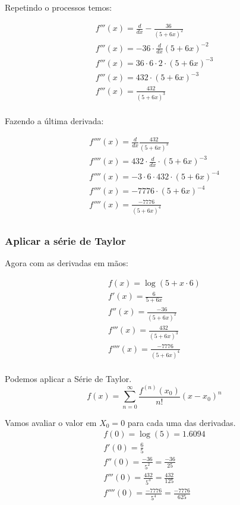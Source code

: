 Repetindo o processos temos:

\[
    \begin{aligned}
        f'''(x) = \frac{d}{dx} -\frac{36}{(5 + 6x)^{2}} \\
        f'''(x) = - 36 \cdot \frac{d}{dx} (5 + 6x)^{-2} \\
        f'''(x) = 36 \cdot 6 \cdot 2 \cdot (5 + 6x)^{-3} \\
        f'''(x) = 432 \cdot (5 + 6x)^{-3} \\
        f'''(x) = \frac{432}{ (5 + 6x)^{3} } \\
    \end{aligned}
\]

Fazendo a última derivada:

\[
    \begin{aligned}
        f''''(x) =\frac{d}{dx} \frac{432}{ (5 + 6x)^{3} }\\
        f''''(x) = 432 \cdot \frac{d}{dx} \cdot (5 + 6x)^{-3}\\
        f''''(x) = -3 \cdot 6 \cdot 432 \cdot (5 + 6x)^{-4}\\
        f''''(x) = -7776 \cdot (5 + 6x)^{-4}\\
        f''''(x) = \frac{-7776}{(5 + 6x)^{4}}\\
    \end{aligned}
\]

\subsubsection{Aplicar a série de Taylor}

Agora com as derivadas em mãos:

\[
    \begin{aligned}
        f(x)     =  \log(5 + x \cdot 6)        \\
        f'(x)    =  \frac{6}{5 + 6x}           \\
        f''(x)   =  \frac{-36}{ (5 + 6x)^{2} } \\
        f'''(x)  =  \frac{432}{ (5 + 6x)^{3} } \\
        f''''(x) =  \frac{-7776}{(5 + 6x)^{4}} \\
    \end{aligned}
\]

Podemos aplicar a Série de Taylor.
\[
    f(x) = \sum_{n=0}^{\infty} \frac{f^{(n)}(x_0)}{n!}(x - x_0)^n
\]

Vamos avaliar o valor em $X_0 = 0$ para cada uma das derivadas.
    \begin{gather*}
        f(0) =    \log(5) = 1.6094 \\
        f'(0) =    \frac{6}{5} \\
        f''(0) =   \frac{-36}{5^{2}}  = \frac{-36}{25} \\
        f'''(0) =  \frac{432}{5^{3}}  = \frac{432}{125} \\
        f''''(0) = \frac{-7776}{5^{4}} = \frac{-7776}{625} \\
    \end{gather*}

